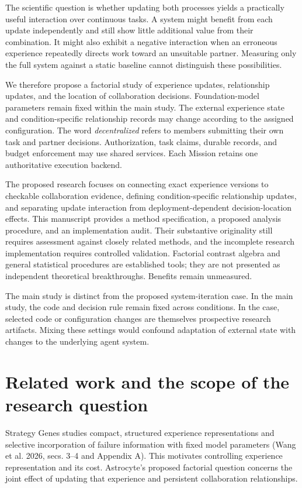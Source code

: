 \documentclass[
  english,
  11pt,
]{article}
\begin{document}
The scientific question is whether updating both processes yields a
practically useful interaction over continuous tasks. A system might
benefit from each update independently and still show little additional
value from their combination. It might also exhibit a negative
interaction when an erroneous experience repeatedly directs work toward
an unsuitable partner. Measuring only the full system against a static
baseline cannot distinguish these possibilities.

We therefore propose a factorial study of experience updates,
relationship updates, and the location of collaboration decisions.
Foundation-model parameters remain fixed within the main study. The
external experience state and condition-specific relationship records
may change according to the assigned configuration. The word
\emph{decentralized} refers to members submitting their own task and
partner decisions. Authorization, task claims, durable records, and
budget enforcement may use shared services. Each Mission retains one
authoritative execution backend.

The proposed research focuses on connecting exact experience versions to
checkable collaboration evidence, defining condition-specific
relationship updates, and separating update interaction from
deployment-dependent decision-location effects. This manuscript provides
a method specification, a proposed analysis procedure, and an
implementation audit. Their substantive originality still requires
assessment against closely related methods, and the incomplete research
implementation requires controlled validation. Factorial contrast
algebra and general statistical procedures are established tools; they
are not presented as independent theoretical breakthroughs. Benefits
remain unmeasured.

The main study is distinct from the proposed system-iteration case. In
the main study, the code and decision rule remain fixed across
conditions. In the case, selected code or configuration changes are
themselves prospective research artifacts. Mixing these settings would
confound adaptation of external state with changes to the underlying
agent system.

\section{Related work and the scope of the research
question}\label{related-work-and-the-scope-of-the-research-question}

Strategy Genes studies compact, structured experience representations
and selective incorporation of failure information with fixed model
parameters (Wang et al. 2026, secs. 3--4 and Appendix A). This motivates
controlling experience representation and its cost. Astrocyte's proposed
factorial question concerns the joint effect of updating that experience
and persistent collaboration relationships.
\end{document}
